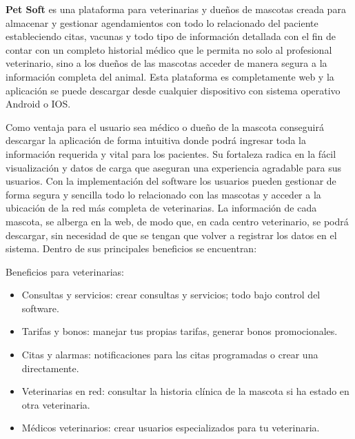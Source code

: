 


\textbf{ Pet Soft}  es una plataforma para veterinarias y dueños de mascotas creada para almacenar y gestionar agendamientos con todo lo relacionado del paciente estableciendo citas, vacunas y todo tipo de información detallada con el fin de contar con un completo historial médico que le permita no solo al profesional veterinario, sino a los dueños de las mascotas acceder de manera segura a la información completa del animal. Esta plataforma es completamente web y la aplicación se puede descargar desde cualquier dispositivo con sistema operativo Android o IOS.

Como ventaja para el usuario sea médico o dueño de la mascota conseguirá descargar la aplicación de forma intuitiva donde podrá ingresar toda la información requerida y vital para los pacientes. Su fortaleza radica en la fácil visualización y datos de carga que aseguran una experiencia agradable para sus usuarios. Con la implementación del software los usuarios pueden gestionar de forma segura y sencilla todo lo relacionado con las mascotas y acceder a la ubicación de la red más completa de veterinarias. La información de cada mascota, se alberga en la web, de modo que, en cada centro veterinario, se podrá descargar, sin necesidad de que se tengan que volver a registrar los datos en el sistema. Dentro de sus principales beneficios se encuentran:

Beneficios para veterinarias:
\begin{itemize}


\item	Consultas y servicios: crear consultas y servicios; todo bajo control del software.
\item	Tarifas y bonos: manejar tus propias tarifas, generar bonos promocionales.
\item	Citas y alarmas: notificaciones para las citas programadas o crear una directamente.
\item	Veterinarias en red: consultar la historia clínica de la mascota si ha estado en otra veterinaria.
\item	Médicos veterinarios: crear usuarios especializados para tu veterinaria.

\end{itemize}

